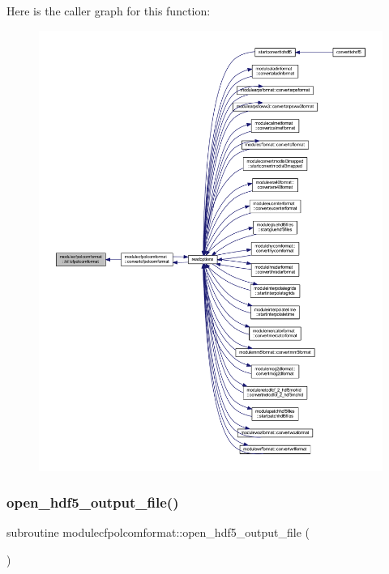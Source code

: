 Here is the caller graph for this function\+:\nopagebreak
\begin{figure}[H]
\begin{center}
\leavevmode
\includegraphics[width=350pt]{namespacemodulecfpolcomformat_a3017fd95b8b5cbe08856f9644c9f6533_icgraph}
\end{center}
\end{figure}
\mbox{\label{namespacemodulecfpolcomformat_aa08f9068cb50c9ebecda0e3eac54124c}} 
\subsubsection{\texorpdfstring{open\+\_\+hdf5\+\_\+output\+\_\+file()}{open\_hdf5\_output\_file()}}
{\footnotesize\ttfamily subroutine modulecfpolcomformat\+::open\+\_\+hdf5\+\_\+output\+\_\+file (\begin{DoxyParamCaption}{ }\end{DoxyParamCaption})\hspace{0.3cm}{\ttfamily [private]}}

